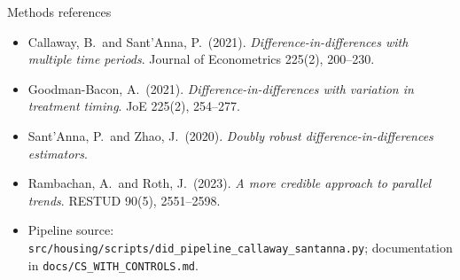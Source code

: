 \documentclass[11pt,aspectratio=169]{beamer}
\begin{document}
\begin{frame}{Methods references}
\begin{itemize}\footnotesize
  \item Callaway, B.\ and Sant'Anna, P.\ (2021). \emph{Difference-in-differences with multiple time periods}. Journal of Econometrics 225(2), 200--230.
  \item Goodman-Bacon, A.\ (2021). \emph{Difference-in-differences with variation in treatment timing}. JoE 225(2), 254--277.
  \item Sant'Anna, P.\ and Zhao, J.\ (2020). \emph{Doubly robust difference-in-differences estimators}.
  \item Rambachan, A.\ and Roth, J.\ (2023). \emph{A more credible approach to parallel trends}. RESTUD 90(5), 2551--2598.
  \item Pipeline source: \texttt{src/housing/scripts/did\_pipeline\_callaway\_santanna.py}; documentation in \texttt{docs/CS\_WITH\_CONTROLS.md}.
\end{itemize}
\end{frame}
\end{document}
